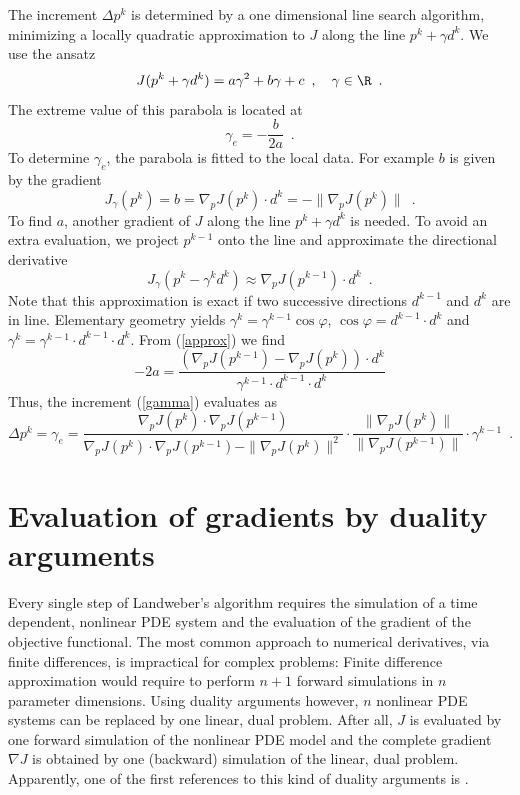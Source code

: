 The increment $\Delta p^k$ is determined by a one dimensional line search algorithm,
minimizing a locally quadratic approximation to $J$ along the line $p^k + \gamma d^k$.
We use the ansatz
$$
 J(p^k + \gamma d^k) = a \gamma^2 + b \gamma + c \enspace , \quad \gamma \in \R \enspace .
$$
The extreme value of this parabola is located at
\begin{equation} \label{gamma}
 \gamma_e = - \frac{b}{2a} \enspace .
\end{equation}
To determine $\gamma_e$, the parabola is fitted to the local data.
For example $b$ is given by the gradient
$$
 J_\gamma(p^k) = b = \nabla_p J(p^k) \cdot d^k = - \| \nabla_p J(p^k) \| \enspace .
$$
To find $a$, another gradient of $J$ along the line $p^k + \gamma d^k$ is needed.
To avoid an extra evaluation, we project $p^{k-1}$ onto the line
and approximate the directional derivative
\begin{equation} \label{approx}
 J_\gamma(p^k-\gamma^k d^k) \approx \nabla_p J(p^{k-1}) \cdot d^k \enspace .
\end{equation}
Note that this approximation is exact
if two successive directions $d^{k-1}$ and $d^k$ are in line.
Elementary geometry yields
$\gamma^k = \gamma^{k-1} \cos \varphi$,
$\cos \varphi = d^{k-1} \cdot d^k$ and
$\gamma^k = \gamma^{k-1} \cdot d^{k-1} \cdot d^k$.
From (\ref{approx}) we find
$$
 -2 a =
 \frac{(\nabla_p J(p^{k-1}) - \nabla_p J(p^k))\cdot d^k}
      {\gamma^{k-1} \cdot d^{k-1} \cdot d^k}
$$
Thus, the increment (\ref{gamma}) evaluates as
$$
 \Delta p^k = \gamma_e =
 \frac{\nabla_p J(p^k)\cdot \nabla_p J(p^{k-1})}
      {\nabla_p J(p^k)\cdot \nabla_p J(p^{k-1}) - \|\nabla_p J(p^k)\|^2} \cdot
 \frac{\|\nabla_p J(p^k)\|}{\|\nabla_p J(p^{k-1})\|} \cdot
 \gamma^{k-1} \enspace .
$$

\section{Evaluation of gradients by duality arguments}

Every single step of Landweber's algorithm requires the simulation of a time dependent, nonlinear PDE system
and the evaluation of the gradient of the objective functional.
The most common approach to numerical derivatives, via finite differences,
is impractical for complex problems:
Finite difference approximation would require to perform $n+1$ forward simulations in $n$ parameter dimensions.
Using duality arguments however, $n$ nonlinear PDE systems can be replaced by one linear, dual problem.
After all, $J$ is evaluated by one forward simulation of the nonlinear PDE model
and the complete gradient $\nabla J$ is obtained by one (backward) simulation of the linear, dual problem.
Apparently, one of the first references to this kind of duality arguments is \cite{ChaventLemmonier1974}.

